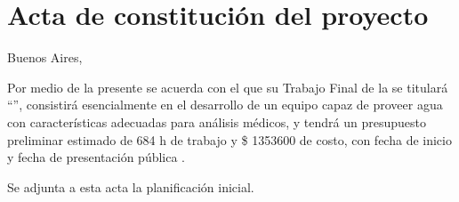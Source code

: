 \documentclass[
11pt, %
]{charter}
\begin{document}
\pagebreak



\section*{Acta de constitución del proyecto}
\label{sec:acta}

\begin{flushright}
Buenos Aires, \fechaInicioName
\end{flushright}

\vspace{2cm}

Por medio de la presente se acuerda con el \authorname\hspace{1px} que su Trabajo Final de la \degreename\hspace{1px} se titulará ``\ttitle'', consistirá esencialmente en el desarrollo de un equipo capaz de proveer agua con características adecuadas para análisis médicos, y tendrá un presupuesto preliminar estimado de 684 h de trabajo y \$ 1353600 de costo, con fecha de inicio \fechaInicioName\hspace{1px} y fecha de presentación pública \fechaFinalName.

Se adjunta a esta acta la planificación inicial.

\vfill
\end{document}
